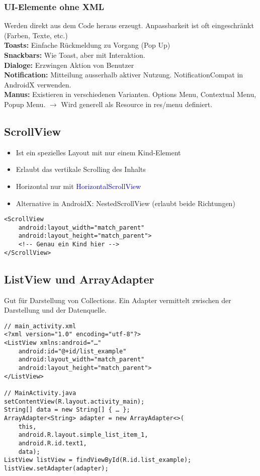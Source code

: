 \subsubsection{UI-Elemente ohne XML}
Werden direkt aus dem Code heraus erzeugt. Anpassbarkeit ist oft eingeschränkt (Farben, Texte, etc.)\\
\textbf{Toasts:} Einfache Rückmeldung zu Vorgang (Pop Up)\\
\textbf{Snackbars:} Wie Toast, aber mit Interaktion.\\
\textbf{Dialoge:} Erzwingen Aktion von Benutzer\\
\textbf{Notification:} Mitteilung ausserhalb aktiver Nutzung. NotificationCompat in AndroidX verwenden.\\
\textbf{Manus:} Existieren in verschiedenen Varianten. Options Menu, Contextual Menu, Popup Menu. $\rightarrow$ Wird generell als Resource in res/menu definiert.
\subsection{ScrollView}
\begin{itemize}[topsep=0pt, leftmargin=4mm]
    \setlength\itemsep{-0.3em}
    \item Ist ein spezielles Layout mit nur einem Kind-Element
    \item Erlaubt das vertikale Scrolling des Inhalts
    \item Horizontal nur mit \textcolor{blue}{HorizontalScrollView}
    \item Alternative in AndroidX: NestedScrollView (erlaubt beide Richtungen)
\end{itemize}
\begin{lstlisting}
<ScrollView
    android:layout_width="match_parent"
    android:layout_height="match_parent">
    <!-- Genau ein Kind hier -->
</ScrollView>
\end{lstlisting}
\subsection{ListView und ArrayAdapter}
Gut für Darstellung von Collections. Ein Adapter vermittelt zwischen der Darstellung und der Datenquelle.
\begin{lstlisting}
// main_activity.xml
<?xml version="1.0" encoding="utf-8"?>
<ListView xmlns:android="…"
    android:id="@+id/list_example"
    android:layout_width="match_parent"
    android:layout_height="match_parent">
</ListView>

// MainActivity.java
setContentView(R.layout.activity_main);
String[] data = new String[] { … };
ArrayAdapter<String> adapter = new ArrayAdapter<>(
    this,
    android.R.layout.simple_list_item_1,
    android.R.id.text1,
    data);
ListView listView = findViewById(R.id.list_example);
listView.setAdapter(adapter);
\end{lstlisting}
